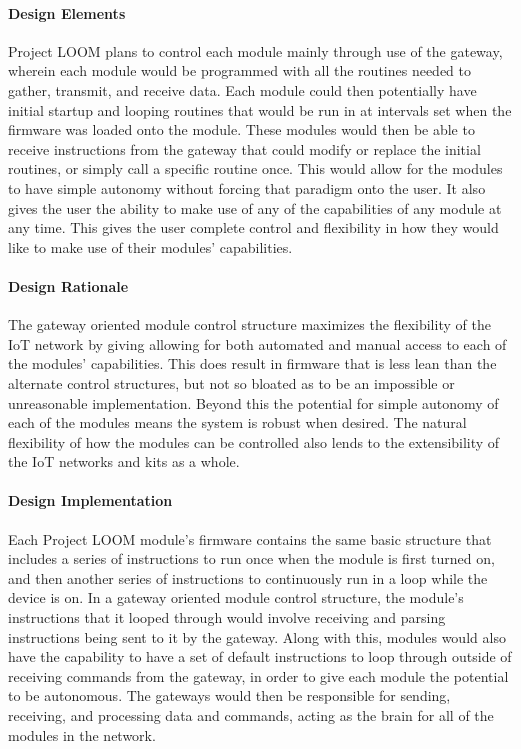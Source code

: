 \documentclass[onecolumn, draftclsnofoot,10pt, compsoc]{IEEEtran}
\begin{document}
\paragraph{Design Elements}
    Project LOOM plans to control each module mainly through use of the gateway, wherein each module would be programmed with all the routines needed to gather, transmit, and receive data. Each module could then potentially have initial startup and looping routines that would be run in at intervals set when the firmware was loaded onto the module. These modules would then be able to receive instructions from the gateway that could modify or replace the initial routines, or simply call a specific routine once. This would allow for the modules to have simple autonomy without forcing that paradigm onto the user. It also gives the user the ability to make use of any of the capabilities of any module at any time. This gives the user complete control and flexibility in how they would like to make use of their modules' capabilities.

\paragraph{Design Rationale}
    The gateway oriented module control structure maximizes the flexibility of the IoT network by giving allowing for both automated and manual access to each of the modules' capabilities. This does result in firmware that is less lean than the alternate control structures, but not so bloated as to be an impossible or unreasonable implementation. Beyond this the potential for simple autonomy of each of the modules means the system is robust when desired. The natural flexibility of how the modules can be controlled also lends to the extensibility of the IoT networks and kits as a whole. 

\paragraph{Design Implementation}
    Each Project LOOM module's firmware contains the same basic structure that includes a series of instructions to run once when the module is first turned on, and then another series of instructions to continuously run in a loop while the device is on. In a gateway oriented module control structure, the module's instructions that it looped through would involve receiving and parsing instructions being sent to it by the gateway. Along with this, modules would also have the capability to have a set of default instructions to loop through outside of receiving commands from the gateway, in order to give each module the potential to be autonomous. The gateways would then be responsible for sending, receiving, and processing data and commands, acting as the brain for all of the modules in the network. 
\end{document}
